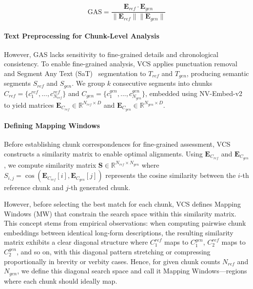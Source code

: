 \documentclass[letterpaper]{article} %
\begin{document}
\begin{equation} \label{eq:gas_revised}
\text{GAS} = \frac{\mathbf{E}_{ref} \cdot \mathbf{E}_{gen}}{\|\mathbf{E}_{ref}\| \|\mathbf{E}_{gen}\|}
\end{equation}

\paragraph{Text Preprocessing for Chunk-Level Analysis}
However, GAS lacks sensitivity to fine-grained details and chronological consistency. To enable fine-grained analysis, VCS applies punctuation removal and Segment Any Text (SaT)~\citep{frohmann-etal-2024-segment} segmentation to $T_{ref}$ and $T_{gen}$, producing semantic segments $S_{ref}$ and $S_{gen}$. We group $k$ consecutive segments into chunks $C_{ref} = \{c_1^{ref}, ..., c_{N_{ref}}^{ref}\}$ and $C_{gen} = \{c_1^{gen}, ..., c_{N_{gen}}^{gen}\}$, embedded using NV-Embed-v2 to yield matrices $\mathbf{E}_{C_{ref}} \in \mathbb{R}^{N_{ref} \times D}$ and $\mathbf{E}_{C_{gen}} \in \mathbb{R}^{N_{gen} \times D}$.

\paragraph{Defining Mapping Windows}
Before establishing chunk correspondences for fine-grained assessment, VCS constructs a similarity matrix to enable optimal alignments. Using $\mathbf{E}_{C_{ref}}$ and $\mathbf{E}_{C_{gen}}$, we compute similarity matrix $\mathbf{S} \in \mathbb{R}^{N_{ref} \times N_{gen}}$ where $S_{i,j} = \cos(\mathbf{E}_{C_{ref}}[i], \mathbf{E}_{C_{gen}}[j])$ represents the cosine similarity between the $i$-th reference chunk and $j$-th generated chunk.

However, before selecting the best match for each chunk, VCS defines Mapping Windows (MW) that constrain the search space within this similarity matrix. This concept stems from empirical observations: when computing pairwise chunk embeddings between identical long-form descriptions, the resulting similarity matrix exhibits a clear diagonal structure where $C_1^{ref}$ maps to $C_1^{gen}$, $C_2^{ref}$ maps to $C_2^{gen}$, and so on, with this diagonal pattern stretching or compressing proportionally in brevity or verbity cases. Hence, for given chunk counts $N_{ref}$ and $N_{gen}$, we define this diagonal search space and call it Mapping Windows—regions where each chunk should ideally map.
\end{document}
